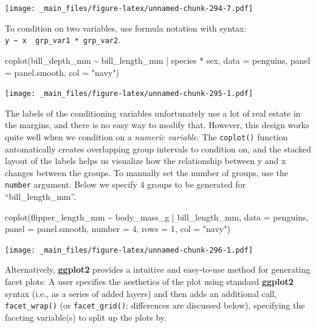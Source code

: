 \documentclass[
]{book}
\newenvironment{Shaded}{\begin{snugshade}}{\end{snugshade}}
\newcommand{\AttributeTok}[1]{\textcolor[rgb]{0.77,0.63,0.00}{#1}}
\newcommand{\DecValTok}[1]{\textcolor[rgb]{0.00,0.00,0.81}{#1}}
\newcommand{\FunctionTok}[1]{\textcolor[rgb]{0.00,0.00,0.00}{#1}}
\newcommand{\NormalTok}[1]{#1}
\newcommand{\SpecialCharTok}[1]{\textcolor[rgb]{0.00,0.00,0.00}{#1}}
\newcommand{\StringTok}[1]{\textcolor[rgb]{0.31,0.60,0.02}{#1}}
\begin{document}
\texttt{[image: \_main\_files/figure-latex/unnamed-chunk-294-7.pdf]}

To condition on two variables, use formula notation with syntax: \texttt{y\ \textasciitilde{}\ x\ \textbar{}\ grp\_var1\ *\ grp\_var2}.

\begin{Shaded}
\begin{Highlighting}[]
\FunctionTok{coplot}\NormalTok{(bill\_depth\_mm }\SpecialCharTok{\textasciitilde{}}\NormalTok{ bill\_length\_mm }\SpecialCharTok{|}\NormalTok{ species }\SpecialCharTok{*}\NormalTok{ sex, }
       \AttributeTok{data =}\NormalTok{ penguins,}
       \AttributeTok{panel =}\NormalTok{ panel.smooth,}
       \AttributeTok{col =} \StringTok{"navy"}\NormalTok{)}
\end{Highlighting}
\end{Shaded}

\texttt{[image: \_main\_files/figure-latex/unnamed-chunk-295-1.pdf]}

The labels of the conditioning variables unfortunately use a lot of real estate in the margins, and there is no easy way to modify that. However, this design works quite well when we condition on a \emph{numeric variable}. The \texttt{coplot()} function automatically creates overlapping group intervals to condition on, and the stacked layout of the labels helps us visualize how the relationship between y and x changes between the groups. To manually set the number of groups, use the \texttt{number} argument. Below we specify 4 groups to be generated for ``bill\_length\_mm''.

\begin{Shaded}
\begin{Highlighting}[]
\FunctionTok{coplot}\NormalTok{(flipper\_length\_mm }\SpecialCharTok{\textasciitilde{}}\NormalTok{ body\_mass\_g }\SpecialCharTok{|}\NormalTok{ bill\_length\_mm, }
       \AttributeTok{data =}\NormalTok{ penguins,}
       \AttributeTok{panel =}\NormalTok{ panel.smooth,}
       \AttributeTok{number =} \DecValTok{4}\NormalTok{, }
       \AttributeTok{rows =} \DecValTok{1}\NormalTok{, }\AttributeTok{col =} \StringTok{"navy"}\NormalTok{)}
\end{Highlighting}
\end{Shaded}

\texttt{[image: \_main\_files/figure-latex/unnamed-chunk-296-1.pdf]}

Alternatively, \textbf{ggplot2} provides a intuitive and easy-to-use method for generating facet plots: A user specifies the aesthetics of the plot using standard \textbf{ggplot2} syntax (i.e., as a series of added layers) and then adds an additional call, \texttt{facet\_wrap()} (or \texttt{facet\_grid()}; differences are discussed below), specifying the faceting variable(s) to split up the plots by.
\end{document}

